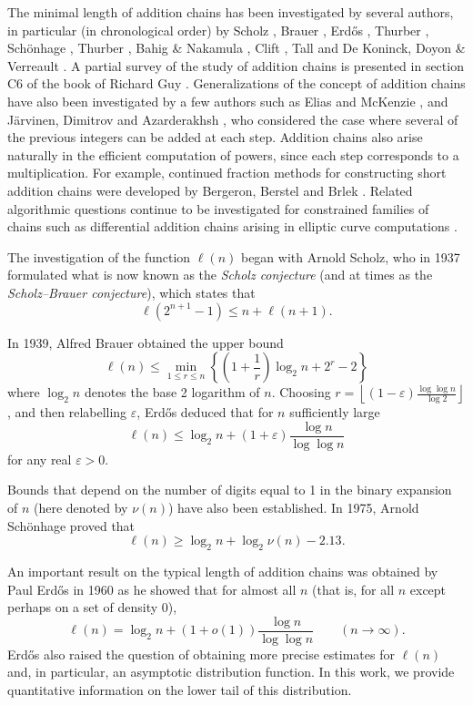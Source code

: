 \documentclass{article}
\theoremstyle{definition}
\begin{document}
The minimal length of addition chains has been investigated by several authors, in particular (in chronological order) by Scholz \cite{scholz}, Brauer \cite{brauer}, Erd\H{o}s \cite{erdos}, Thurber \cite{thurber2}, Sch\"onhage \cite{schonhage}, Thurber \cite{thurber1}, Bahig \& Nakamula \cite{bahig}, Clift \cite{clift}, Tall \cite{tall} and De Koninck, Doyon \& Verreault \cite{DKN}. A partial survey of the study of addition chains is presented in section C6 of the book of Richard Guy \cite{guy}. Generalizations of the concept of addition chains have also been investigated by a few authors such as Elias and McKenzie \cite{Elias}, and Järvinen, Dimitrov and Azarderakhsh \cite{Jarvinen}, who considered the case where several of the previous integers can be added at each step. Addition chains also arise naturally in the efficient computation of powers, since each step corresponds to a multiplication. For example,
continued fraction methods for constructing short addition chains were developed by Bergeron, Berstel and Brlek \cite{BBB}. Related algorithmic questions continue to be investigated for constrained families of chains such as differential addition chains arising in elliptic curve computations \cite{BCL}.


The investigation of the function $\ell(n)$ began with Arnold Scholz, who in 1937 formulated \cite{scholz} what is now known as the {\it Scholz conjecture} (and at times as the {\it Scholz--Brauer conjecture}), which states that
$$\ell(2^{n+1}-1)\le n +\ell(n+1).$$


In 1939, Alfred Brauer \cite{brauer} obtained the upper bound
$$\ell(n) \le \min_{1\le r \le n} \left\{ \left( 1+ \frac 1r \right) \log_2 n +2^r -2 \right\}$$
where $\log_2 n$ denotes the base 2 logarithm of $n$.
Choosing $\displaystyle{ r =\left\lfloor (1-\varepsilon) \frac{\log \log n}{\log 2}  \right\rfloor}$, and then relabelling $\varepsilon$, Erd\H{o}s deduced \cite{erdos} that for $n$ sufficiently large
\begin{equation*}
\ell(n) \le \log_2 n +(1+\varepsilon) \frac{\log n}{\log \log n}
\end{equation*}
for any real $\varepsilon>0$.


Bounds that depend on the number of digits equal to 1 in the binary expansion of $n$ (here denoted by $\nu(n)$) have also been established.
In 1975, Arnold Sch\"onhage \cite{schonhage} proved that
$$\ell(n)\ge \log_2 n + \log_2 \nu(n) -2.13.$$


An important result on the typical length of addition chains was obtained by Paul Erd\H{o}s in 1960 as he showed \cite{erdos} that for almost all $n$ (that is, for all $n$ except perhaps on a set of density 0),
$$\ell(n) = \log_2 n + (1+o(1)) \frac{\log n}{\log \log n} \qquad (n\to \infty).$$
Erd\H{o}s also raised the question of obtaining more precise estimates for $\ell(n)$ and, in particular, an asymptotic distribution function. In this work, we provide quantitative information on the lower tail of this distribution. 
\end{document}
